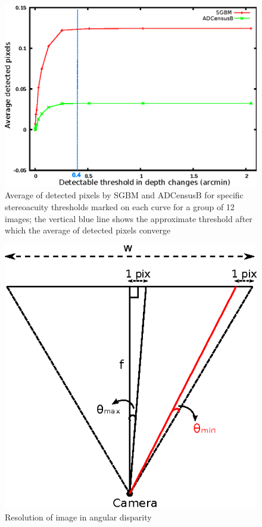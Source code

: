 \begin{figure}[H]
\centering
\includegraphics{algthreshBoth}
\caption{Average of detected pixels by SGBM and ADCensusB for specific stereoacuity thresholds marked on each curve for a group of 12 images; the vertical blue line
shows the approximate threshold after which the average of detected pixels converge}
\label{fig:algthresh}
\end{figure} 
\begin{figure}[H]
\centering
\includegraphics{camRes}
\caption{Resolution of image in angular disparity}
\label{fig:camResolution}
\vspace{-5mm}
\end{figure}

